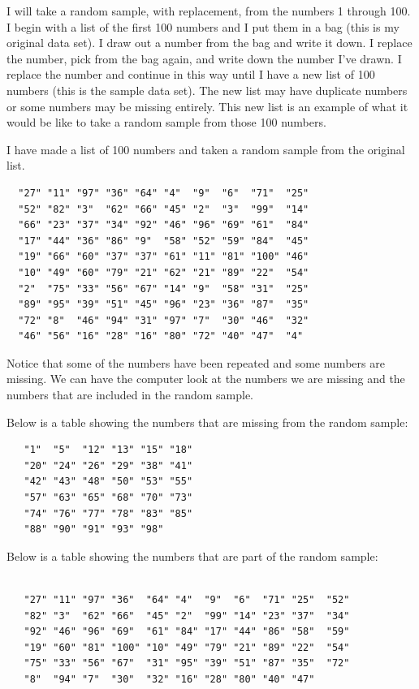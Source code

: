 \documentclass[12pt,twoside]{reedthesis}
\begin{document}
  I will take a random sample, with replacement, from the numbers 1
  through 100. I begin with a list of the first 100 numbers and I put them
  in a bag (this is my original data set). I draw out a number from the
  bag and write it down. I replace the number, pick from the bag again,
  and write down the number I've drawn. I replace the number and continue
  in this way until I have a new list of 100 numbers (this is the sample
  data set). The new list may have duplicate numbers or some numbers may
  be missing entirely. This new list is an example of what it would be
  like to take a random sample from those 100 numbers.
  
  I have made a list of 100 numbers and taken a random sample from the
  original list.
  
  \begin{verbatim}
  "27" "11" "97" "36" "64" "4"  "9"  "6"  "71"  "25" 
  "52" "82" "3"  "62" "66" "45" "2"  "3"  "99"  "14" 
  "66" "23" "37" "34" "92" "46" "96" "69" "61"  "84" 
  "17" "44" "36" "86" "9"  "58" "52" "59" "84"  "45" 
  "19" "66" "60" "37" "37" "61" "11" "81" "100" "46" 
  "10" "49" "60" "79" "21" "62" "21" "89" "22"  "54" 
  "2"  "75" "33" "56" "67" "14" "9"  "58" "31"  "25" 
  "89" "95" "39" "51" "45" "96" "23" "36" "87"  "35" 
  "72" "8"  "46" "94" "31" "97" "7"  "30" "46"  "32" 
  "46" "56" "16" "28" "16" "80" "72" "40" "47"  "4"  
  \end{verbatim}
  
  Notice that some of the numbers have been repeated and some numbers are
  missing. We can have the computer look at the numbers we are missing and
  the numbers that are included in the random sample.
  
  \newpage
  
  Below is a table showing the numbers that are missing from the random
  sample:
  
  \begin{verbatim}
   "1"  "5"  "12" "13" "15" "18"
   "20" "24" "26" "29" "38" "41"
   "42" "43" "48" "50" "53" "55"
   "57" "63" "65" "68" "70" "73"
   "74" "76" "77" "78" "83" "85"
   "88" "90" "91" "93" "98" 
  \end{verbatim}
  
  Below is a table showing the numbers that are part of the random sample:
  
  \begin{verbatim}
  
   "27" "11" "97" "36"  "64" "4"  "9"  "6"  "71" "25"  "52" 
   "82" "3"  "62" "66"  "45" "2"  "99" "14" "23" "37"  "34" 
   "92" "46" "96" "69"  "61" "84" "17" "44" "86" "58"  "59" 
   "19" "60" "81" "100" "10" "49" "79" "21" "89" "22"  "54" 
   "75" "33" "56" "67"  "31" "95" "39" "51" "87" "35"  "72" 
   "8"  "94" "7"  "30"  "32" "16" "28" "80" "40" "47"  
  \end{verbatim}
  
\end{document}
